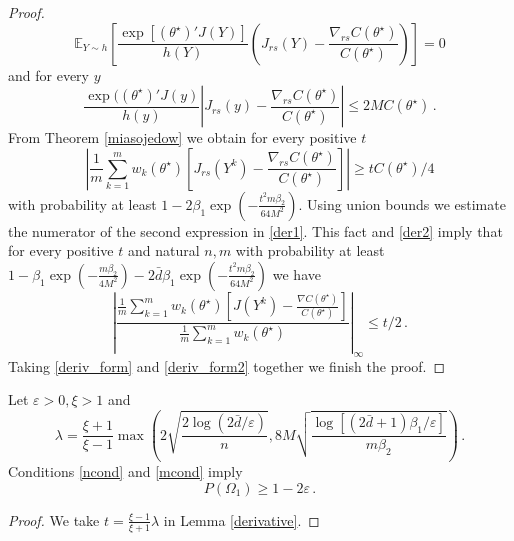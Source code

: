 \documentclass[twoside,11pt]{article}
\def\th{\theta}
\def\Ex{\mathbb{E}}
\def\ths{\th^\star}
\def\rs{_{rs}}
\def\grad{\nabla}
\def\bbd{\bar{d}}
\begin{document}
\begin{proof}
\[
\Ex _{Y \sim h} \left[\frac{\exp \left[(\ths)'J(Y)\right]}{h(Y)} \left( J \rs (Y) - \frac{\grad \rs C(\ths)}{C(\ths)} \right) \right] =0
\]
and for every $y$
\[
\frac{\exp((\ths)'J(y)}{h(y)} \left| J \rs (y) - \frac{\grad \rs C(\ths)}{C(\ths)}
\right| \leq 2 M C(\ths)\, .
\]
From Theorem \ref{miasojedow} we obtain for every positive $t$
\[
\left|\frac{1}{m} \sum\limits_{k=1}^{m} w_k(\ths) \left[ J \rs (Y^k) - \frac{\grad \rs C(\ths)}{C(\ths)} \right] \right|
\geq t C(\ths)/4                    
\]
with probability at least  $1- 2 \beta_1 \exp \left(  -  \frac{ t^2 m \beta_2  }{64 M^2} \right)$.
Using union bounds we estimate the numerator of the second expression in \eqref{der1}.
This fact and \eqref{der2} imply that for every positive $t$ and natural $n,m$ with probability at least
$1- \beta_1 \exp \left(  -  \frac{m \beta_2  }{4 M^2}                     \right)  -2 \bbd \beta_1 \exp \left(  -  \frac{ t^2 m \beta_2  }{64 M^2} \right)
$ 
we have 
\begin{equation}
\label{deriv_form2}
\left|\frac{\frac{1}{m} \sum\limits_{k=1}^{m} w_k(\ths) \left[ J(Y^k) - \frac{\grad C(\ths)}{C(\ths)} \right]}
                 {\frac{1}{m} \sum\limits_{k=1}^{m} w_k(\ths) } \right| _\infty \leq t/2\,.
\end{equation}
Taking \eqref{deriv_form} and \eqref{deriv_form2} together we finish the proof.

\end{proof}


\begin{corollary}
\label{cor_der}
Let $\varepsilon >0, \xi >1$ and
\[\lambda = \frac{\xi + 1}{\xi -1}  \max\left(2 \sqrt{\frac{2 \log(2 \bbd/\varepsilon)}{n}}, 
8 M \sqrt{ \frac{\log\left[(2 \bbd+1)\beta_1 /\varepsilon\right]}{m\beta_2}}
\right)\,.
\]
Conditions \eqref{ncond} and \eqref{mcond} imply 
\[P(\Omega_1 ) \geq 1-2 \varepsilon\,.\]
\end{corollary}

\begin{proof}
We take $t=\frac{\xi -1}{\xi +1} \lambda$ in Lemma \ref{derivative}.
\end{proof}
\end{document}
